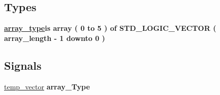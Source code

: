 \subsection*{Types}
 \begin{DoxyCompactItemize}
\item 
\hypertarget{classbin2bcd_1_1Behavioral_a30db87baa00a17c4425999fa5f359bb3}{{\bfseries \hyperlink{classbin2bcd_1_1Behavioral_a30db87baa00a17c4425999fa5f359bb3}{array\-\_\-type}{\bfseries \textcolor{vhdlkeyword}{is}\textcolor{vhdlchar}{ }\textcolor{vhdlchar}{ }\textcolor{vhdlkeyword}{array}\textcolor{vhdlchar}{ }\textcolor{vhdlchar}{(}\textcolor{vhdlchar}{ } \textcolor{vhdldigit}{0} \textcolor{vhdlchar}{ }\textcolor{vhdlchar}{ }\textcolor{vhdlchar}{ }\textcolor{vhdlkeyword}{to}\textcolor{vhdlchar}{ }\textcolor{vhdlchar}{ }\textcolor{vhdlchar}{ } \textcolor{vhdldigit}{5} \textcolor{vhdlchar}{ }\textcolor{vhdlchar}{)}\textcolor{vhdlchar}{ }\textcolor{vhdlchar}{ }\textcolor{vhdlkeyword}{of}\textcolor{vhdlchar}{ }\textcolor{comment}{S\-T\-D\-\_\-\-L\-O\-G\-I\-C\-\_\-\-V\-E\-C\-T\-O\-R}\textcolor{vhdlchar}{ }\textcolor{vhdlchar}{(}\textcolor{vhdlchar}{ }\textcolor{vhdlchar}{ }\textcolor{vhdlchar}{array\-\_\-length}\textcolor{vhdlchar}{ }\textcolor{vhdlchar}{-\/}\textcolor{vhdlchar}{ } \textcolor{vhdldigit}{1} \textcolor{vhdlchar}{ }\textcolor{vhdlchar}{ }\textcolor{vhdlchar}{ }\textcolor{vhdlkeyword}{downto}\textcolor{vhdlchar}{ }\textcolor{vhdlchar}{ }\textcolor{vhdlchar}{ } \textcolor{vhdldigit}{0} \textcolor{vhdlchar}{ }\textcolor{vhdlchar}{)}\textcolor{vhdlchar}{ }}} }\label{classbin2bcd_1_1Behavioral_a30db87baa00a17c4425999fa5f359bb3}

\end{DoxyCompactItemize}
\subsection*{Signals}
 \begin{DoxyCompactItemize}
\item 
\hypertarget{classbin2bcd_1_1Behavioral_aa35c068917536e24186e420d790f1c2f}{\hyperlink{classbin2bcd_1_1Behavioral_aa35c068917536e24186e420d790f1c2f}{temp\-\_\-vector} {\bfseries \textcolor{vhdlchar}{array\-\_\-\-Type}\textcolor{vhdlchar}{ }} }\label{classbin2bcd_1_1Behavioral_aa35c068917536e24186e420d790f1c2f}

\end{DoxyCompactItemize}
